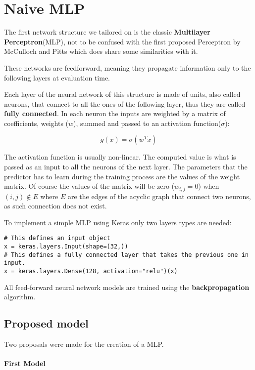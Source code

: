 \newpage
\section{Naive MLP}
\label{sec:naive-mlp}

The first network structure we tailored on is the classic \textbf{Multilayer Perceptron}(MLP), not to be confused with
the first proposed Perceptron by McCulloch and Pitts\cite{mcculloch43a} which does share some similarities with it.

These networks are feedforward, meaning they propagate information only to the following layers at evaluation time.

Each layer of the neural network of this structure is made of units, also called neurons, that connect
to all the ones of the following layer, thus they are called \textbf{fully connected}.
In each neuron the inputs are weighted by a matrix of coefficients, weights ($w$), summed and passed to an activation function($\sigma$):

\[g(x) = \sigma(w^Tx)\]

The activation function is usually non-linear. The computed value is what is passed as an input to all the neurons of the next layer.
The parameters that the predictor has to learn during the training process are the values of the weight matrix.
Of course the values of the matrix will be zero ($w_{i,j} = 0$) when $(i,j) \notin E$ where $E$ are the edges of the acyclic graph
that connect two neurons, as such connection does not exist.

To implement a simple MLP using Keras only two layers types are needed:
\begin{verbatim}
# This defines an input object
x = keras.layers.Input(shape=(32,))
# This defines a fully connected layer that takes the previous one in input.
x = keras.layers.Dense(128, activation="relu")(x)
\end{verbatim}

All feed-forward neural network models are trained using the \textbf{backpropagation} algorithm\cite{kelley1960gradient}.

\subsection{Proposed model}
Two proposals were made for the creation of a MLP.

\paragraph{First Model}

